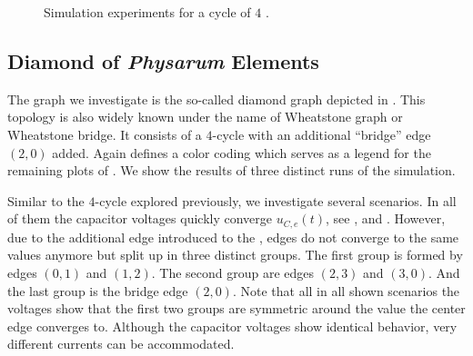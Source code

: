 		\begin{figure}
			\centering
			\qquad
			\newline
			\qquad
			\newline
			\qquad
			\newline
			\qquad
			
			\caption[Simulation - Cycles]{Simulation experiments for a cycle of $4$ \Pes.}
			\label{fig:cycle}
		\end{figure}

	\subsection{Diamond of \emph{Physarum} Elements}

		The graph we investigate is the so-called diamond graph depicted in . This topology is also widely known under the name of Wheatstone graph or Wheatstone bridge. It consists of a $4$-cycle with an additional ``bridge'' edge $(2,0)$ added. Again  defines a color coding which serves as a legend for the remaining plots of . We show the results of three distinct runs of the simulation.

		Similar to the $4$-cycle explored previously, we investigate several scenarios. In all of them the capacitor voltages quickly converge $u_{C,e}(t)$, see ,  and . However, due to the additional edge introduced to the \Pn, edges do not converge to the same values anymore but split up in three distinct groups. The first group is formed by edges $(0,1)$ and $(1,2)$. The second group are edges $(2,3)$ and $(3,0)$. And the last group is the bridge edge $(2,0)$. Note that all in all shown scenarios the voltages show that the first two groups are symmetric around the value the center edge converges to. Although the capacitor voltages show identical behavior, very different currents can be accommodated.

